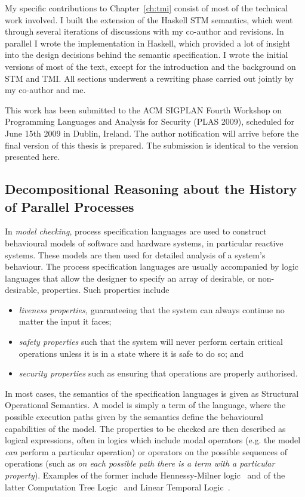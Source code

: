 My specific contributions to Chapter~\ref{ch:tmi} consist of most of the technical
work involved. I built the extension of the Haskell STM semantics, which went
through several iterations of discussions with my co-author and revisions. In
parallel I wrote the implementation in Haskell, which provided a lot of insight
into the design decisions behind the semantic specification. I wrote the initial
versions of most of the text, except for the introduction and the background on
STM and TMI. All sections underwent a rewriting phase carried out jointly by
my co-author and me.

This work has been submitted to the ACM SIGPLAN Fourth Workshop on Programming
Languages and Analysis for Security (PLAS 2009), scheduled for June 15th 2009
in Dublin, Ireland. The author notification will arrive before the final version
of this thesis is prepared. The submission is identical to the version presented
here.


\subsection{Decompositional Reasoning about the History of Parallel Processes} %

In \emph{model checking}, process specification languages are used to construct
behavioural models of software and hardware systems, in particular reactive
systems. These models are then used
for detailed analysis of a system's behaviour. The process specification languages
are usually accompanied by logic languages that allow the designer to specify an
array of desirable, or non-desirable, properties. Such properties include 
\begin{itemize}
    \item \emph{liveness properties,} guaranteeing that the system can always 
    continue no matter the input it faces;
    \item \emph{safety properties} such that the system will never perform certain critical
    operations unless it is in a state where it is safe to do so; and
    \item \emph{security properties} such as ensuring that operations are properly authorised.
\end{itemize}

In most cases, the semantics of the specification languages is given as Structural
Operational Semantics. A model is simply a term of the language, where the possible
execution paths given by the semantics define the behavioural capabilities of
the model. The properties to be checked are then described as logical expressions,
often in logics which include modal operators (e.g. the model \emph{can} perform
a particular operation) or operators on the possible sequences of operations (such
as \emph{on each possible path there is a term with a particular property}).
Examples of the former include Hennessy-Milner logic~\cite{Hennessy85} 
and of the latter Computation Tree Logic~\cite{CE81} and Linear Temporal
Logic~\cite{Pnueli77}.

